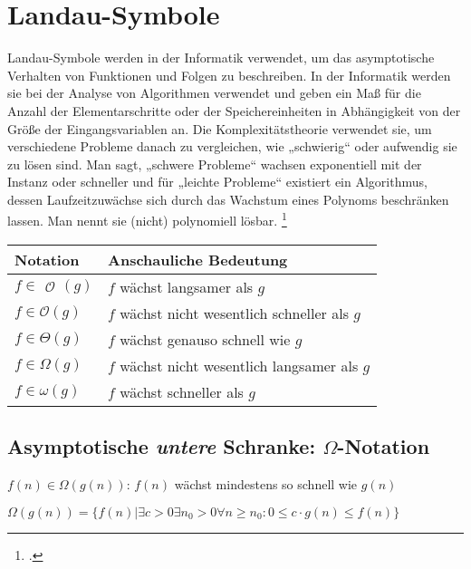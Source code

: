 \documentclass{lehramt-informatik-haupt}
\begin{document}
\section{Landau-Symbole}

Landau-Symbole werden in der Informatik verwendet, um das asymptotische
Verhalten von Funktionen und Folgen zu beschreiben. In der Informatik
werden sie bei der Analyse von Algorithmen verwendet und geben ein Maß
für die Anzahl der Elementarschritte oder der Speichereinheiten in
Abhängigkeit von der Größe der Eingangsvariablen an. Die
Komplexitätstheorie verwendet sie, um verschiedene Probleme danach zu
vergleichen, wie „schwierig“ oder aufwendig sie zu lösen sind. Man sagt,
„schwere Probleme“ wachsen exponentiell mit der Instanz oder schneller
und für „leichte Probleme“ existiert ein Algorithmus, dessen
Laufzeitzuwächse sich durch das Wachstum eines Polynoms beschränken
lassen. Man nennt sie (nicht) polynomiell lösbar.
\footcite{wiki:landau-symbole}

\begin{center}
\begin{tabular}{ll}
\textbf{Notation} &
\textbf{Anschauliche Bedeutung}
\\\hline

$f \in \begin{smallmatrix}\!\mathcal{O}\!\end{smallmatrix}(g)$ &
$f$ wächst langsamer als $g$
\\\hline

$f \in \mathcal{O}(g)$ &
$f$ wächst nicht wesentlich schneller als $g$
\\\hline

$f \in \Theta(g)$ &
$f$ wächst genauso schnell wie $g$
\\\hline

$f \in \Omega(g)$ &
$f$ wächst nicht wesentlich langsamer als $g$
\\\hline

$f \in \omega(g)$ &
$f$ wächst schneller als $g$
\\\hline
\end{tabular}
\end{center}

\subsection{Asymptotische \emph{untere} Schranke: $\Omega$-Notation}

\begin{compactitem}
\item $f(n) \in \Omega(g(n))$: $f(n)$ wächst mindestens so schnell wie $g(n)$
\item $\Omega(g(n)) = \{f(n) | \exists c > 0 \exists n_0 > 0 \forall n \geq n_0: 0 \leq c \cdot g(n) \leq f(n) \}$
\end{compactitem}
\end{document}
